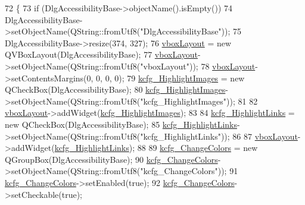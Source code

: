 \begin{DoxyCode}
72     \{
73         \textcolor{keywordflow}{if} (DlgAccessibilityBase->objectName().isEmpty())
74             DlgAccessibilityBase->setObjectName(QString::fromUtf8(\textcolor{stringliteral}{"DlgAccessibilityBase"}));
75         DlgAccessibilityBase->resize(374, 327);
76         \hyperlink{classUi__DlgAccessibilityBase_abb6e3109a50289ea7dd8791e43379d3e}{vboxLayout} = \textcolor{keyword}{new} QVBoxLayout(DlgAccessibilityBase);
77         \hyperlink{classUi__DlgAccessibilityBase_abb6e3109a50289ea7dd8791e43379d3e}{vboxLayout}->setObjectName(QString::fromUtf8(\textcolor{stringliteral}{"vboxLayout"}));
78         \hyperlink{classUi__DlgAccessibilityBase_abb6e3109a50289ea7dd8791e43379d3e}{vboxLayout}->setContentsMargins(0, 0, 0, 0);
79         \hyperlink{classUi__DlgAccessibilityBase_a06bcf6b5838dd7dd61e796416b064b6b}{kcfg\_HighlightImages} = \textcolor{keyword}{new} QCheckBox(DlgAccessibilityBase);
80         \hyperlink{classUi__DlgAccessibilityBase_a06bcf6b5838dd7dd61e796416b064b6b}{kcfg\_HighlightImages}->setObjectName(QString::fromUtf8(\textcolor{stringliteral}{"kcfg\_HighlightImages"}));
81 
82         \hyperlink{classUi__DlgAccessibilityBase_abb6e3109a50289ea7dd8791e43379d3e}{vboxLayout}->addWidget(\hyperlink{classUi__DlgAccessibilityBase_a06bcf6b5838dd7dd61e796416b064b6b}{kcfg\_HighlightImages});
83 
84         \hyperlink{classUi__DlgAccessibilityBase_aa5b4ab2a5fa80185e567cdfd3af9b3c8}{kcfg\_HighlightLinks} = \textcolor{keyword}{new} QCheckBox(DlgAccessibilityBase);
85         \hyperlink{classUi__DlgAccessibilityBase_aa5b4ab2a5fa80185e567cdfd3af9b3c8}{kcfg\_HighlightLinks}->setObjectName(QString::fromUtf8(\textcolor{stringliteral}{"kcfg\_HighlightLinks"}));
86 
87         \hyperlink{classUi__DlgAccessibilityBase_abb6e3109a50289ea7dd8791e43379d3e}{vboxLayout}->addWidget(\hyperlink{classUi__DlgAccessibilityBase_aa5b4ab2a5fa80185e567cdfd3af9b3c8}{kcfg\_HighlightLinks});
88 
89         \hyperlink{classUi__DlgAccessibilityBase_ad69ec5ae9e5bad5756a57dac036500eb}{kcfg\_ChangeColors} = \textcolor{keyword}{new} QGroupBox(DlgAccessibilityBase);
90         \hyperlink{classUi__DlgAccessibilityBase_ad69ec5ae9e5bad5756a57dac036500eb}{kcfg\_ChangeColors}->setObjectName(QString::fromUtf8(\textcolor{stringliteral}{"kcfg\_ChangeColors"}));
91         \hyperlink{classUi__DlgAccessibilityBase_ad69ec5ae9e5bad5756a57dac036500eb}{kcfg\_ChangeColors}->setEnabled(\textcolor{keyword}{true});
92         \hyperlink{classUi__DlgAccessibilityBase_ad69ec5ae9e5bad5756a57dac036500eb}{kcfg\_ChangeColors}->setCheckable(\textcolor{keyword}{true});

\end{DoxyCode}
